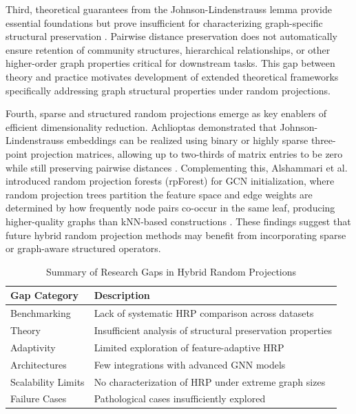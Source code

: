 \documentclass[conference]{IEEEtran}
\begin{document}
Third, theoretical guarantees from the Johnson-Lindenstrauss lemma provide essential foundations but prove insufficient for characterizing graph-specific structural preservation \cite{johnson1984, tadic2024}. Pairwise distance preservation does not automatically ensure retention of community structures, hierarchical relationships, or other higher-order graph properties critical for downstream tasks. This gap between theory and practice motivates development of extended theoretical frameworks specifically addressing graph structural properties under random projections.

Fourth, sparse and structured random projections emerge as key enablers of efficient dimensionality reduction. 
Achlioptas demonstrated that Johnson-Lindenstrauss embeddings can be realized using binary or highly sparse three-point projection matrices, allowing up to two-thirds of matrix entries to be zero while still preserving pairwise distances \cite{achlioptas2003}. 
Complementing this, Alshammari et al. introduced random projection forests (rpForest) for GCN initialization, where random projection trees partition the feature space and edge weights are determined by how frequently node pairs co-occur in the same leaf, producing higher-quality graphs than kNN-based constructions \cite{alshammari2020rpforest}. 
These findings suggest that future hybrid random projection methods may benefit from incorporating sparse or graph-aware structured operators.

\begin{table}[ht]
\centering
\caption{Summary of Research Gaps in Hybrid Random Projections}
\label{tab:research_gaps}
\begin{tabular}{l p{5.5cm}} 
\toprule
\textbf{Gap Category} & \textbf{Description} \\
\midrule
Benchmarking & Lack of systematic HRP comparison across datasets \\
Theory & Insufficient analysis of structural preservation properties \\
Adaptivity & Limited exploration of feature-adaptive HRP \\
Architectures & Few integrations with advanced GNN models \\
Scalability Limits & No characterization of HRP under extreme graph sizes \\
Failure Cases & Pathological cases insufficiently explored \\
\bottomrule
\end{tabular}
\end{table}
\end{document}
